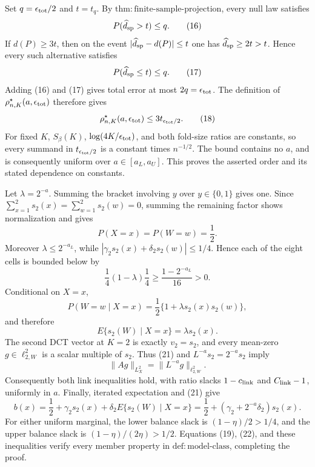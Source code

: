 Set \(q=\epsilon_{\rm tot}/2\) and \(t=t_q\).  By \(\mathrm{thm:finite\mbox{-}sample\mbox{-}projection}\), every null law satisfies
\[
 P(\widehat d_{\rm sp}>t)\le q. \tag{16}
\]
If \(d(P)\ge3t\), then on the event \(|\widehat d_{\rm sp}-d(P)|\le t\) one has \(\widehat d_{\rm sp}\ge2t>t\).  Hence every such alternative satisfies
\[
 P(\widehat d_{\rm sp}\le t)\le q. \tag{17}
\]
Adding (16) and (17) gives total error at most \(2q=\epsilon_{\rm tot}\).  The definition of \(\rho^\star_{n,K}(a,\epsilon_{\rm tot})\) therefore gives
\[
 \rho^\star_{n,K}(a,\epsilon_{\rm tot})\le3t_{\epsilon_{\rm tot}/2}. \tag{18}
\]
For fixed \(K\), \(S_\beta(K)\), \(\log(4K/\epsilon_{\rm tot})\), and both fold-size ratios are constants, so every summand in \(t_{\epsilon_{\rm tot}/2}\) is a constant times \(n^{-1/2}\).  The bound contains no \(a\), and is consequently uniform over \(a\in[a_L,a_U]\).  This proves the asserted order and its stated dependence on constants.

Let \(\lambda=2^{-a}\).  Summing the bracket involving \(y\) over \(y\in\{0,1\}\) gives one.  Since \(\sum_{x=1}^2s_2(x)=\sum_{w=1}^2s_2(w)=0\), summing the remaining factor shows normalization and gives
\[
 P(X=x)=P(W=w)=\frac12. \tag{19}
\]
Moreover \(\lambda\le2^{-a_L}\), while \(|\gamma_2s_2(x)+\delta_2s_2(w)|\le1/4\).  Hence each of the eight cells is bounded below by
\[
 \frac14(1-\lambda)\frac14\ge\frac{1-2^{-a_L}}{16}>0. \tag{20}
\]
Conditional on \(X=x\),
\[
 P(W=w\mid X=x)=\frac12\{1+\lambda s_2(x)s_2(w)\},
\]
and therefore
\[
 E\{s_2(W)\mid X=x\}=\lambda s_2(x). \tag{21}
\]
The second DCT vector at \(K=2\) is exactly \(v_2=s_2\), and every mean-zero \(g\in\ell^2_{2,W}\) is a scalar multiple of \(s_2\).  Thus (21) and \(L^{-a}s_2=2^{-a}s_2\) imply
\[
 \|Ag\|_{L^2_X}=\|L^{-a}g\|_{\ell^2_{2,W}}. \tag{22}
\]
Consequently both link inequalities hold, with ratio slacks \(1-c_{\rm link}\) and \(C_{\rm link}-1\), uniformly in \(a\).  Finally, iterated expectation and (21) give
\[
 b(x)=\frac12+\gamma_2s_2(x)+\delta_2E\{s_2(W)\mid X=x\}
 =\frac12+(\gamma_2+2^{-a}\delta_2)s_2(x). \tag{23}
\]
For either uniform marginal, the lower balance slack is \((1-\eta)/2>1/4\), and the upper balance slack is \((1-\eta)/(2\eta)>1/2\).  Equations (19), (22), and these inequalities verify every member property in \(\mathrm{def:model\mbox{-}class}\), completing the proof.

